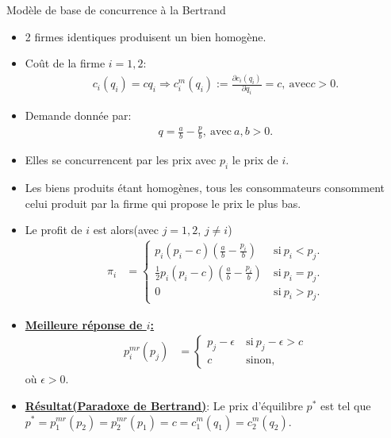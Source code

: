 \begin{frame}[allowframebreaks]{Modèle de base de concurrence à la Bertrand}
\begin{itemize}
    \item 2 firmes identiques produisent un bien homogène.  
    \item Coût de la firme $i=1, 2$:
    \begin{align*}
        c_i(q_i)=cq_i \Rightarrow c^m_i(q_i):= \frac{\partial c_i(q_i)}{\partial q_i} = c, \ \text{avec} c > 0.
    \end{align*}
    \item Demande donnée par: 
    \begin{align*}
        q = \frac{a}{b} -\frac{p}{b}, \ \text{avec} \ a, b > 0.
    \end{align*}
    \item Elles se concurrencent par les prix avec $p_i$ le prix de $i$.
    \item Les biens produits étant homogènes, tous les consommateurs consomment celui produit par la firme 
    qui propose le prix le plus bas. 
    \item Le profit de $i$ est alors(avec $j=1, 2$, $j\neq i$)
    \begin{align*}
        \pi_i &=\left\{
            \begin{array}{ll}
                p_i(p_i-c)\left(  \frac{a}{b} -\frac{p_i}{b} \right) & \ \text{si} \ p_i<p_j.\\
                \frac{1}{2}p_i(p_i-c)\left(  \frac{a}{b} -\frac{p_i}{b} \right) & \ \text{si} \ p_i = p_j.\\
                 0& \ \text{si} \ p_i > p_j.
            \end{array}
        \right.
    \end{align*}
    \item \textbf{\underline{Meilleure réponse de $i$:}}
    \begin{align*}
         p^{mr}_i(p_j) &=
         \left\{
         \begin{array}{ll}
            p_j - \epsilon & \ \text{si} \ p_j  -\epsilon> c\\
            c & \ \text{sinon},
         \end{array}
         \right.
    \end{align*}
    où $\epsilon > 0$.
    \item \textbf{\underline{Résultat(Paradoxe de Bertrand)}}: Le prix d'équilibre $p^*$ est tel que $p^* = p^{mr}_1(p_2) = p^{mr}_2(p_1) =c=c^m_1(q_1) = c^m_2(q_2)$.
\end{itemize}
\end{frame}

